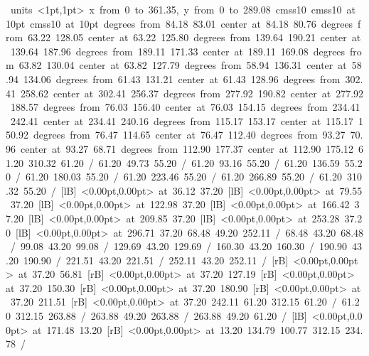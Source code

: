 \hbox{\beginpicture
\setcoordinatesystem units <1pt,1pt>
\setplotarea x from 0 to 361.35, y from 0 to 289.08
\setlinear
\font\picfont cmss10\picfont
\font\picfont cmss10 at 10pt\picfont
\font\picfont cmss10 at 10pt\picfont
{} degrees from 84.18 83.01 center at 84.18 80.76
 degrees from 63.22 128.05 center at 63.22 125.80
 degrees from 139.64 190.21 center at 139.64 187.96
 degrees from 189.11 171.33 center at 189.11 169.08
 degrees from 63.82 130.04 center at 63.82 127.79
 degrees from 58.94 136.31 center at 58.94 134.06
 degrees from 61.43 131.21 center at 61.43 128.96
 degrees from 302.41 258.62 center at 302.41 256.37
 degrees from 277.92 190.82 center at 277.92 188.57
 degrees from 76.03 156.40 center at 76.03 154.15
 degrees from 234.41 242.41 center at 234.41 240.16
 degrees from 115.17 153.17 center at 115.17 150.92
 degrees from 76.47 114.65 center at 76.47 112.40
 degrees from 93.27 70.96 center at 93.27 68.71
 degrees from 112.90 177.37 center at 112.90 175.12
\setsolid
{} 61.20 310.32 61.20 /
\setsolid
{} 61.20 49.73 55.20 /
\setsolid
{} 61.20 93.16 55.20 /
\setsolid
{} 61.20 136.59 55.20 /
\setsolid
{} 61.20 180.03 55.20 /
\setsolid
{} 61.20 223.46 55.20 /
\setsolid
{} 61.20 266.89 55.20 /
\setsolid
{} 61.20 310.32 55.20 /
  [lB] <0.00pt,0.00pt> at 36.12 37.20
  [lB] <0.00pt,0.00pt> at 79.55 37.20
  [lB] <0.00pt,0.00pt> at 122.98 37.20
  [lB] <0.00pt,0.00pt> at 166.42 37.20
  [lB] <0.00pt,0.00pt> at 209.85 37.20
  [lB] <0.00pt,0.00pt> at 253.28 37.20
  [lB] <0.00pt,0.00pt> at 296.71 37.20
\setsolid
{} 68.48 49.20 252.11 /
\setsolid
{} 68.48 43.20 68.48 /
\setsolid
{} 99.08 43.20 99.08 /
\setsolid
{} 129.69 43.20 129.69 /
\setsolid
{} 160.30 43.20 160.30 /
\setsolid
{} 190.90 43.20 190.90 /
\setsolid
{} 221.51 43.20 221.51 /
\setsolid
{} 252.11 43.20 252.11 /
 [rB] <0.00pt,0.00pt> at 37.20 56.81
 [rB] <0.00pt,0.00pt> at 37.20 127.19
 [rB] <0.00pt,0.00pt> at 37.20 150.30
 [rB] <0.00pt,0.00pt> at 37.20 180.90
 [rB] <0.00pt,0.00pt> at 37.20 211.51
 [rB] <0.00pt,0.00pt> at 37.20 242.11
\setsolid
{} 61.20 312.15 61.20 /
 61.20 312.15 263.88 /
 263.88 49.20 263.88 /
 263.88 49.20 61.20 /
  [lB] <0.00pt,0.00pt> at 171.48 13.20
 [rB] <0.00pt,0.00pt> at 13.20 134.79
\setsolid
{} 100.77 312.15 234.78 /
\endpicture
}
